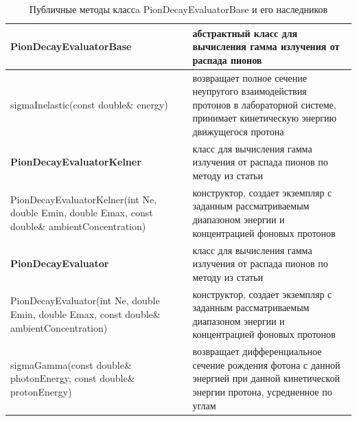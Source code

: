 \begin{table}[h]
	\begin{center}
		\begin{small}
			\caption{Публичные методы классa PionDecayEvaluatorBase и его наследников }
			\label{pionDecay}
			\begin{tabularx}{\textwidth}{|X|X|} 
				\hline
				\textbf{PionDecayEvaluatorBase} & абстрактный класс для вычисления гамма излучения от распада пионов\\
				\hline
				sigmaInelastic(const double\& energy) & возвращает полное сечение неупругого взаимодействия протонов в лабораторной системе, принимает кинетическую энергию движущегося протона\\
				\hline
				\textbf{PionDecayEvaluatorKelner} & класс для вычисления гамма излучения от распада пионов по методу из статьи \cite{Kelner}\\
				\hline
				PionDecayEvaluatorKelner(int Ne, double Emin, double Emax, const double\& ambientConcentration) & конструктор, создает экземпляр с заданным рассматриваемым диапазоном энергии и концентрацией фоновых протонов\\
				\hline
				\textbf{PionDecayEvaluator} & класс для вычисления гамма излучения от распада пионов по методу из статьи \cite{Kafexhiu}\\
				\hline
				PionDecayEvaluator(int Ne, double Emin, double Emax, const double\& ambientConcentration) & конструктор, создает экземпляр с заданным рассматриваемым диапазоном энергии и концентрацией фоновых протонов\\
				\hline
				sigmaGamma(const double\& photonEnergy, const double\& protonEnergy) & возвращает дифференциальное сечение рождения фотона с данной энергией при данной кинетической энергии протона, усредненное по углам\\
				\hline
			\end{tabularx}
		\end{small}
	\end{center}
\end{table}


